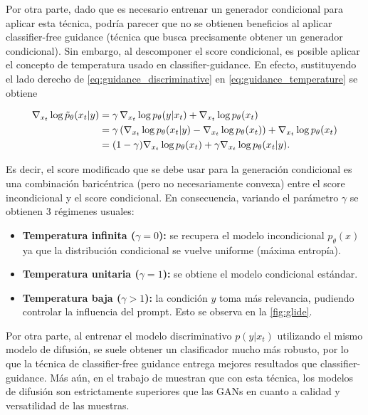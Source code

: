 Por otra parte, dado que es necesario entrenar un generador condicional para aplicar esta técnica, podría parecer que no se obtienen beneficios al aplicar classifier-free guidance (técnica que busca precisamente obtener un generador condicional). Sin embargo, al descomponer el score condicional, es posible aplicar el concepto de temperatura usado en classifier-guidance. En efecto, sustituyendo el lado derecho de \eqref{eq:guidance_discriminative} en \eqref{eq:guidance_temperature} se obtiene

\begin{align*}
    \nabla_{x_t} \log \tilde{p}_\theta(x_t|y) &= \gamma\,\nabla_{x_t} \log p_\theta(y|x_t) + \nabla_{x_t} \log p_\theta(x_t)\\
    &= \gamma\left(\nabla_{x_t} \log p_\theta(x_t|y) - \nabla_{x_t} \log p_\theta(x_t)\right)+ \nabla_{x_t} \log p_\theta(x_t)\\
    &= (1-\gamma) \nabla_{x_t} \log p_\theta(x_t) + \gamma\nabla_{x_t} \log p_\theta(x_t|y).
\end{align*}

Es decir, el score modificado que se debe usar para la generación condicional es una combinación baricéntrica (pero no necesariamente convexa) entre el score incondicional y el score condicional. En consecuencia, variando el parámetro $\gamma$ se obtienen 3 régimenes usuales:

\begin{itemize}
    \item \textbf{Temperatura infinita ($\gamma=0$):} se recupera el modelo incondicional $p_\theta(x)$ ya que la distribución condicional se vuelve uniforme (máxima entropía).
    \item \textbf{Temperatura unitaria ($\gamma=1$):} se obtiene el modelo condicional estándar.
    \item \textbf{Temperatura baja ($\gamma>1$):} la condición $y$ toma más relevancia, pudiendo controlar la influencia del prompt. Esto se observa en la \autoref{fig:glide}.
\end{itemize}

Por otra parte, al entrenar el modelo discriminativo $p(y|x_t)$ utilizando el mismo modelo de difusión, se suele obtener un clasificador mucho más robusto, por lo que la técnica de classifier-free guidance entrega mejores resultados que classifier-guidance. Más aún, en el trabajo de \cite{ho2022classifierfreediffusionguidance} muestran que con esta técnica, los modelos de difusión son estrictamente superiores que las GANs en cuanto a calidad y versatilidad de las muestras.

